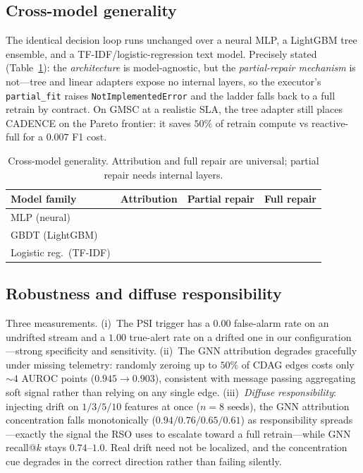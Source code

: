 \documentclass[conference]{IEEEtran}
\newcommand{\yes}{\textcolor{black}{\ding{51}}}
\newcommand{\no}{\textcolor{gray}{\ding{55}}}
\begin{document}
\subsection{Cross-model generality}\label{sec:generality}
The identical decision loop runs unchanged over a neural MLP, a LightGBM
tree ensemble, and a TF-IDF/logistic-regression text model. Precisely
stated (Table~\ref{tab:generality}): the \emph{architecture} is
model-agnostic, but the \emph{partial-repair mechanism} is not---tree and
linear adapters expose no internal layers, so the executor's
\texttt{partial\_fit} raises \texttt{NotImplementedError} and the ladder
falls back to a full retrain by contract. On GMSC at a realistic SLA, the
tree adapter still places CADENCE on the Pareto frontier: it saves $50\%$
of retrain compute vs reactive-full for a $0.007$ F1 cost.

\begin{table}[t]
\centering
\caption{Cross-model generality. Attribution and full repair are
universal; partial repair needs internal layers.}
\label{tab:generality}
\setlength{\tabcolsep}{6pt}
\begin{tabular}{@{}lccc@{}}
\toprule
\textbf{Model family} & \textbf{Attribution} & \textbf{Partial repair} & \textbf{Full repair}\\
\midrule
MLP (neural)             & \yes & \yes & \yes\\
GBDT (LightGBM)          & \yes & \no  & \yes\\
Logistic reg.\ (TF-IDF)  & \yes & \no  & \yes\\
\bottomrule
\end{tabular}
\end{table}

\subsection{Robustness and diffuse responsibility}\label{sec:robustness}
Three measurements. (i)~The PSI trigger has a $0.00$ false-alarm rate on
an undrifted stream and a $1.00$ true-alert rate on a drifted one in our
configuration---strong specificity and sensitivity. (ii)~The GNN
attribution degrades gracefully under missing telemetry: randomly zeroing
up to $50\%$ of CDAG edges costs only $\sim4$ AUROC points
($0.945\to0.903$), consistent with message passing aggregating soft
signal rather than relying on any single edge. (iii)~\emph{Diffuse
responsibility}: injecting drift on $1/3/5/10$ features at once ($n{=}8$
seeds), the GNN attribution concentration falls monotonically
($0.94/0.76/0.65/0.61$) as responsibility spreads---exactly the signal the
RSO uses to escalate toward a full retrain---while GNN recall@$k$ stays
$0.74$--$1.0$. Real drift need not be localized, and the concentration cue
degrades in the correct direction rather than failing silently.
\end{document}
